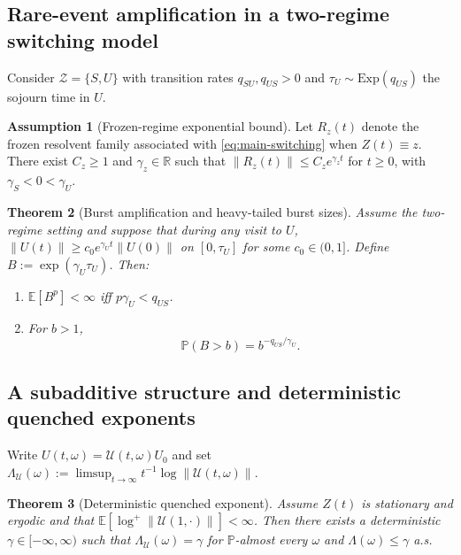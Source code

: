 \documentclass[12pt,a4paper]{article}
\theoremstyle{plain}
\newtheorem{theorem}{Theorem}[section]
\theoremstyle{definition}
\newtheorem{assumption}[theorem]{Assumption}
\theoremstyle{remark}
\begin{document}
\subsection{Rare-event amplification in a two-regime switching model}
\label{subsec:rare-events}

Consider $\mathcal Z=\{S,U\}$ with transition rates $q_{SU},q_{US}>0$ and
$\tau_U\sim\mathrm{Exp}(q_{US})$ the sojourn time in $U$.

\begin{assumption}[Frozen-regime exponential bound]
	\label{ass:frozen-exp}
	Let $R_z(t)$ denote the frozen resolvent family associated with \eqref{eq:main-switching}
	when $Z(t)\equiv z$. There exist $C_z\ge1$ and $\gamma_z\in\mathbb R$ such that
	$\|R_z(t)\|\le C_z e^{\gamma_z t}$ for $t\ge0$, with $\gamma_S<0<\gamma_U$.
\end{assumption}

\begin{theorem}[Burst amplification and heavy-tailed burst sizes]
	\label{thm:burst-qUS}
	Assume the two-regime setting and suppose that during any visit to $U$,
	$\|U(t)\|\ge c_0 e^{\gamma_U t}\|U(0)\|$ on $[0,\tau_U]$ for some $c_0\in(0,1]$.
	Define $B:=\exp(\gamma_U\tau_U)$. Then:
	\begin{enumerate}[label=(\roman*),leftmargin=0.8cm]
		\item $\mathbb E[B^p]<\infty$ iff $p\gamma_U<q_{US}$.
		\item For $b>1$,
		\begin{equation}
			\label{eq:burst-tail}
			\mathbb P(B>b)=b^{-q_{US}/\gamma_U}.
		\end{equation}
	\end{enumerate}
\end{theorem}

\subsection{A subadditive structure and deterministic quenched exponents}
\label{subsec:subadditive}

Write $U(t,\omega)=\mathcal U(t,\omega)U_0$ and set
$\Lambda_{\mathcal U}(\omega):=\limsup_{t\to\infty}t^{-1}\log\|\mathcal U(t,\omega)\|$.

\begin{theorem}[Deterministic quenched exponent]
	\label{thm:subadditive}
	Assume $Z(t)$ is stationary and ergodic and that
	$\mathbb E[\log^+\|\mathcal U(1,\cdot)\|]<\infty$.
	Then there exists a deterministic $\gamma\in[-\infty,\infty)$ such that
	$\Lambda_{\mathcal U}(\omega)=\gamma$ for $\mathbb P$-almost every $\omega$ and
	$\Lambda(\omega)\le \gamma$ a.s.
\end{theorem}
\end{document}
